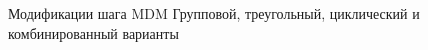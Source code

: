 \SPBGSectionSlide
  {Модификации шага MDM}
  {Групповой, треугольный, циклический и комбинированный варианты}
